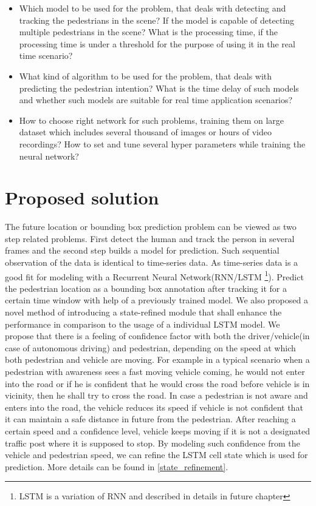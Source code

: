\begin{itemize}
	\item Which model to be used for the problem, that deals with detecting and tracking the pedestrians in the scene? If the model is capable of detecting multiple pedestrians in the scene? What is the processing time, if the processing time is under a threshold for the purpose of using it in the real time scenario?

	\item 
What kind of algorithm to be used for the problem, that deals with predicting the pedestrian intention? What is the time delay of such models and whether such models are suitable for real time application scenarios?

	\item How to choose right network for such problems, training them on large dataset which includes several thousand of images or hours of video recordings? How to set and tune several hyper parameters while training the neural network? 

\end{itemize}

\section{Proposed solution}
The future location or bounding box prediction problem can be viewed as two step related problems. First detect the human and track the person in several frames and the second step builds a model for prediction. Such sequential observation of the data is identical to time-series data. As time-series data is a good fit for modeling with a Recurrent Neural Network(RNN/LSTM \footnote{LSTM is a variation of RNN and described in details in future chapter}). Predict the pedestrian location as a bounding box annotation after tracking it for a certain time window with help of a previously trained model. 
\newpara
We also proposed a novel method of introducing a state-refined module that shall enhance the performance in comparison to the usage of a individual LSTM model. 
We propose that there is a feeling of confidence factor with both the driver/vehicle(in case of autonomous driving) and pedestrian, depending on the speed at which both pedestrian and vehicle are moving. For example in a typical scenario when a pedestrian with awareness sees a fast moving vehicle coming, he would not enter into the road or if he is confident that he would cross the road before vehicle is in vicinity, then he shall try to cross the road. In case a pedestrian is not aware and enters into the road, the vehicle reduces its speed if vehicle is not confident that it can maintain a safe distance in future from the pedestrian. After reaching a certain speed and a confidence level, vehicle keeps moving if it is not a designated traffic post where it is supposed to stop. By modeling such confidence from the vehicle and pedestrian speed, we can refine the LSTM cell state which is used for prediction. More details can be found in \ref{state_refinement}.



